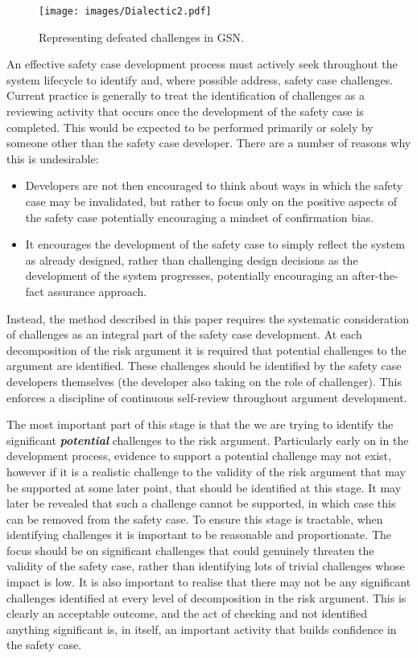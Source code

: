 \begin{figure*}
\texttt{[image: images/Dialectic2.pdf]}
\caption{Representing defeated challenges in GSN.}
\label{fig:dia2}
\end{figure*}

An effective safety case development process must actively seek throughout the system lifecycle to identify and, where possible address, safety case challenges. Current practice is generally to treat the identification of challenges as a reviewing activity that occurs once the development of the safety case is completed. This would be expected to be performed primarily or solely by someone other than the safety case developer. There are a number of reasons why this is undesirable:
\begin{itemize}
    \item Developers are not then encouraged to think about ways in which the safety case may be invalidated, but rather to focus only on the positive aspects of the safety case potentially encouraging a mindset of confirmation bias.
    \item It encourages the development of the safety case to simply reflect the system as already designed, rather than challenging design decisions as the development of the system progresses, potentially encouraging an after-the-fact assurance approach.
    \end{itemize}


Instead, the method described in this paper requires the systematic consideration of challenges as an integral part of the safety case development. At each decomposition of the risk argument it is required that potential challenges to the argument are identified. These challenges should be identified by the safety case developers themselves (the developer also taking on the role of challenger). This enforces a discipline of continuous self-review throughout argument development.

The most important part of this stage is that the we are trying to identify the significant \textbf{\textit{potential}} challenges to the risk argument. Particularly early on in the development process, evidence to support a potential challenge may not exist, however if it is a realistic challenge to the validity of the risk argument that may be supported at some later point, that should be identified at this stage. It may later be revealed that such a challenge cannot be supported, in which case this can be removed from the safety case. To ensure this stage is tractable, when identifying challenges it is important to be reasonable and proportionate. The focus should be on significant challenges that could genuinely threaten the validity of the safety case, rather than identifying lots of trivial challenges whose impact is low. It is also important to realise that there may not be any significant challenges identified at every level of decomposition in the risk argument. This is clearly an acceptable outcome, and the act of checking and not identified anything significant is, in itself, an important activity that builds confidence in the safety case.

